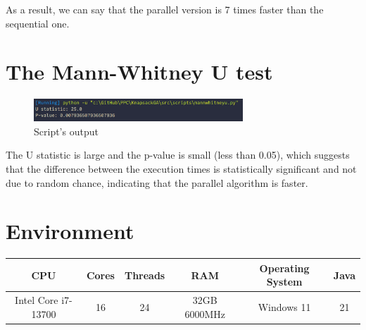 \documentclass[11pt]{report}
\begin{document}
  As a result, we can say that the parallel version is 7 times faster than the sequential one.
  
\section*{The Mann-Whitney U test}

\begin{figure}[h]
  \centering
  \includegraphics[width=0.7\textwidth]{script.png}
  \caption{Script's output}
  
\end{figure}

The U statistic is large and the p-value is small (less than 0.05), which suggests that the difference between the execution times is statistically significant and not due to random chance, indicating that the parallel algorithm is faster.
\section*{Environment}
\begin{tabular}{|c|c|c|c|c|c|}
  \hline
  CPU & Cores & Threads & RAM &  Operating System & Java\\
  \hline
  Intel Core i7-13700 & 16 & 24 & 32GB 6000MHz & Windows 11 & 21\\
  \hline
\end{tabular}
\end{document}
